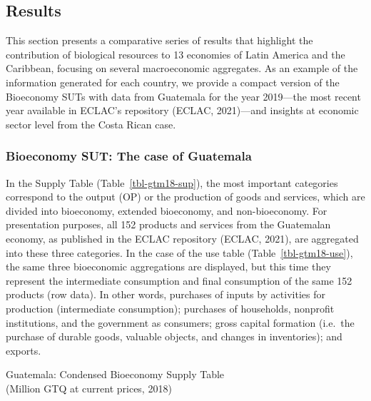 \documentclass[
  letterpaper,
  DIV=11,
  numbers=noendperiod]{scrartcl}
\begin{document}
\subsection{Results}\label{results}

This section presents a comparative series of results that highlight the
contribution of biological resources to 13 economies of Latin America
and the Caribbean, focusing on several macroeconomic aggregates. As an
example of the information generated for each country, we provide a
compact version of the Bioeconomy SUTs with data from Guatemala for the
year 2019---the most recent year available in ECLAC's repository (ECLAC,
2021)---and insights at economic sector level from the Costa Rican case.

\subsubsection{Bioeconomy SUT: The case of
Guatemala}\label{bioeconomy-sut-the-case-of-guatemala}

In the Supply Table (Table~\ref{tbl-gtm18-sup}), the most important
categories correspond to the output (OP) or the production of goods and
services, which are divided into bioeconomy, extended bioeconomy, and
non-bioeconomy. For presentation purposes, all 152 products and services
from the Guatemalan economy, as published in the ECLAC repository
(ECLAC, 2021), are aggregated into these three categories. In the case
of the use table (Table~\ref{tbl-gtm18-use}), the same three bioeconomic
aggregations are displayed, but this time they represent the
intermediate consumption and final consumption of the same 152 products
(row data). In other words, purchases of inputs by activities for
production (intermediate consumption); purchases of households,
nonprofit institutions, and the government as consumers; gross capital
formation (i.e.~the purchase of durable goods, valuable objects, and
changes in inventories); and exports.

\begin{table}

\caption{\label{tbl-gtm18-sup}Guatemala: Condensed Bioeconomy Supply
Table\\
(Million GTQ at current prices, 2018)}


\end{table}%
\end{document}
